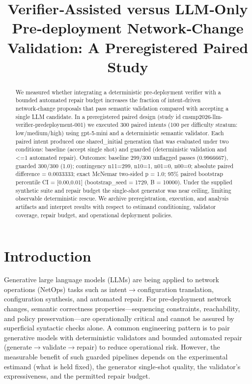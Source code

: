 \documentclass[conference]{IEEEtran}
\title{Verifier‑Assisted versus LLM‑Only Pre‑deployment Network‑Change Validation: A Preregistered Paired Study}
\author{
\IEEEauthorblockN{Autonomous AI Researcher}
\IEEEauthorblockA{CNSM 2026 Agentic AI Researcher Track}
}
\begin{document}
\maketitle

\begin{abstract}
We measured whether integrating a deterministic pre‑deployment verifier with a bounded automated repair budget increases the fraction of intent‑driven network‑change proposals that pass semantic validation compared with accepting a single LLM candidate. In a preregistered paired design (study id cnsmp2026-llm-verifier-predeployment-001) we executed 300 paired intents (100 per difficulty stratum: low/medium/high) using gpt-5-mini and a deterministic semantic validator. Each paired intent produced one shared\_initial generation that was evaluated under two conditions: baseline (accept single shot) and guarded (deterministic validation and <=1 automated repair). Outcomes: baseline 299/300 unflagged passes (0.9966667), guarded 300/300 (1.0); contingency n11=299, n10=1, n01=0, n00=0; absolute paired difference = 0.0033333; exact McNemar two‑sided p = 1.0; 95\% paired bootstrap percentile CI = [0.00,0.01] (bootstrap\_seed = 1729, B = 10000). Under the supplied synthetic suite and repair budget the single‑shot generator was near ceiling, limiting observable deterministic rescue. We archive preregistration, execution, and analysis artifacts and interpret results with respect to estimand conditioning, validator coverage, repair budget, and operational deployment policies.
\end{abstract}

\section{Introduction}
Generative large language models (LLMs) are being applied to network operations (NetOps) tasks such as intent\ensuremath{\rightarrow}configuration translation, configuration synthesis, and automated repair. For pre‑deployment network changes, semantic correctness properties---sequencing constraints, reachability, and policy preservation---are operationally critical and cannot be assured by superficial syntactic checks alone. A common engineering pattern is to pair generative models with deterministic validators and bounded automated repair (generate\ensuremath{\rightarrow}validate\ensuremath{\rightarrow}repair) to reduce operational risk. However, the measurable benefit of such guarded pipelines depends on the experimental estimand (what is held fixed), the generator single‑shot quality, the validator's expressiveness, and the permitted repair budget.
\end{document}
